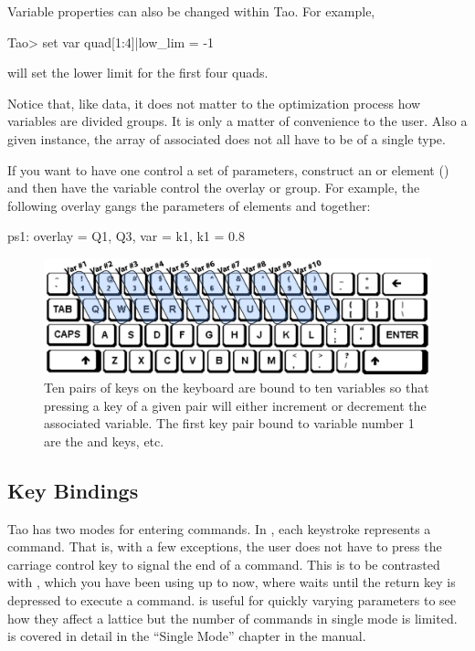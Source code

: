 \documentclass{hitec}     %
\begin{document}
{Variable properties can also be changed within Tao. For example, 
\begin{code}
Tao> set var quad[1:4]|low_lim = -1
\end{code}
will set the lower limit for the first four quads.

Notice that, like data, it does not matter to the optimization process how variables are divided
groups. It is only a matter of convenience to the user. Also a given  instance, the array
of associated  does not all have to be of a single type.

If you want to have one \tao {} control a set of parameters, construct an  or
 element () and then have the \tao variable control the overlay or
group. For example, the following overlay gangs the  parameters of elements  and
 together:
\begin{code}
ps1: overlay = {Q1, Q3}, var = {k1}, k1 = 0.8
\end{code}

\begin{figure}[b]
  \centering
  \includegraphics[width=5in]{keyboard.pdf}
  \caption
{Ten pairs of keys on the keyboard are bound to ten variables so that pressing a key of a given pair
will either increment or decrement the associated variable. The first key pair bound to variable
number 1 are the  and  keys, etc.}
  \label{f:keyboard}
\end{figure}

\subsection{Key Bindings}
\label{s:key.bound}

Tao has two modes for entering commands. In , each keystroke represents a command.
That is, with a few exceptions, the user does not have to press the carriage control key to signal
the end of a command. This is to be contrasted with , which you have been using up to
now, where \tao waits until the return key is depressed to execute a command.  is
useful for quickly varying parameters to see how they affect a lattice but the number of commands in
single mode is limited.  is covered in detail in the ``Single Mode'' chapter in the
\tao manual.

}
\end{document}
